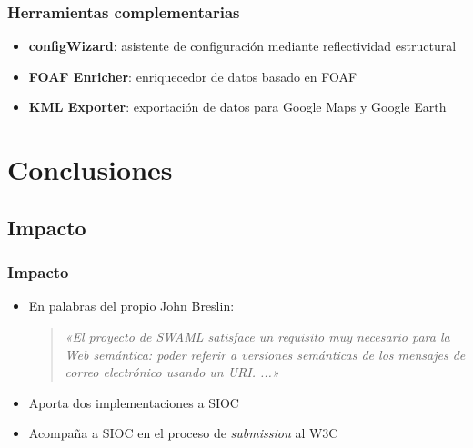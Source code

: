 \documentclass[spanish,notes=hide]{beamer}
\begin{document}
{
  \frametitle{Herramientas complementarias}

  \begin{itemize}
   \item<1-> \textbf{configWizard}: asistente de configuración mediante reflectividad estructural
   \item<2-> \textbf{FOAF Enricher}: enriquecedor de datos basado en FOAF
   \item<3-> \textbf{KML Exporter}: exportación de datos para Google Maps y Google Earth
  \end{itemize}

  \begin{center}
  \end{center}
}

\section{Conclusiones}
\subsection{Impacto}
\frame
{
  \frametitle{Impacto}

  \begin{itemize}
   \item<1-> En palabras del propio John Breslin:
	\begin{quote}
 	  \emph{«El proyecto de SWAML satisface un requisito muy necesario para la Web semántica: 
	  poder referir a versiones semánticas de los mensajes de correo electrónico usando
	  un URI. ...»}
	\end{quote}
   \item<2-> Aporta dos implementaciones a SIOC
   \item<3-> Acompaña a SIOC en el proceso de \textit{submission} al W3C
  \end{itemize}

}
\end{document}
